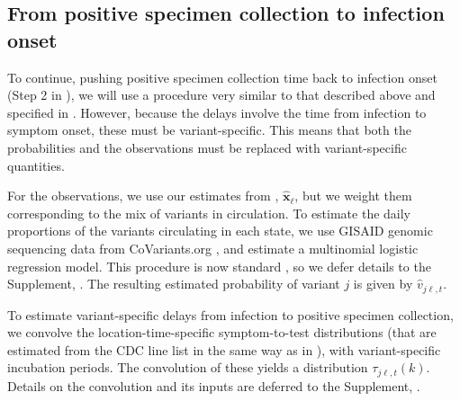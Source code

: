 \subsection{From positive specimen collection to infection onset}
\label{sec:step2-and-3}

To continue, pushing positive specimen collection time back to infection onset
(Step 2 in ), we will use a procedure very
similar to that described above and specified in
. However, because
the delays involve the time from infection to symptom onset, these must be
variant-specific. This means that both the probabilities and the observations
must be replaced with variant-specific quantities. 

For the observations, we use our estimates from ,
$\widehat{\mathbf{x}}_\ell$, but we weight them corresponding to the mix of
variants in circulation. To estimate the daily proportions of the variants
circulating in each state, we use GISAID genomic sequencing data from
CoVariants.org \citep{hodcroft2021covariants, elbe2017data}, and estimate a
multinomial logistic regression model. This procedure is now standard
\citep{obermeyer2022analysis, annavajhala2021emergence, figgins2021sars}, so we
defer details to the Supplement, . The resulting
estimated probability of variant $j$ is given by $\hat{v}_{j\ell,t}$.

To estimate variant-specific delays from infection to positive specimen
collection, we convolve the location-time-specific symptom-to-test distributions
(that are estimated from the CDC line list in the same way as in ), 
with variant-specific incubation periods.
The convolution of these yields a distribution $\tau_{j\ell,t}(k)$. 
Details on the convolution and its inputs are deferred to the Supplement, 
. 

